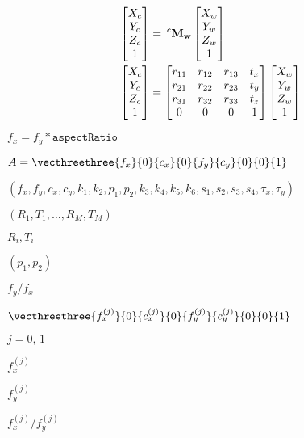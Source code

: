 \documentclass{article}
\begin{document}
\[ \begin{align*} \begin{bmatrix} X_c \\ Y_c \\ Z_c \\ 1 \end{bmatrix} &= \hspace{0.2em} ^{c}\bf{M}_w \begin{bmatrix} X_{w} \\ Y_{w} \\ Z_{w} \\ 1 \end{bmatrix} \\ \begin{bmatrix} X_c \\ Y_c \\ Z_c \\ 1 \end{bmatrix} &= \begin{bmatrix} r_{11} & r_{12} & r_{13} & t_x \\ r_{21} & r_{22} & r_{23} & t_y \\ r_{31} & r_{32} & r_{33} & t_z \\ 0 & 0 & 0 & 1 \end{bmatrix} \begin{bmatrix} X_{w} \\ Y_{w} \\ Z_{w} \\ 1 \end{bmatrix} \end{align*} \]
\pagebreak

$f_x = f_y * \texttt{aspectRatio}$
\pagebreak

$A = \vecthreethree{f_x}{0}{c_x}{0}{f_y}{c_y}{0}{0}{1}$
\pagebreak

$(f_x, f_y, c_x, c_y, k_1, k_2, p_1, p_2, k_3, k_4, k_5, k_6 , s_1, s_2, s_3, s_4, \tau_x, \tau_y)$
\pagebreak

$(R_1, T_1, \dotsc , R_M, T_M)$
\pagebreak

$R_i, T_i$
\pagebreak

$(p_1, p_2)$
\pagebreak

$f_y/f_x$
\pagebreak

$\vecthreethree{f_x^{(j)}}{0}{c_x^{(j)}}{0}{f_y^{(j)}}{c_y^{(j)}}{0}{0}{1}$
\pagebreak

$j = 0,\, 1$
\pagebreak

$f^{(j)}_x$
\pagebreak

$f^{(j)}_y$
\pagebreak

$f^{(j)}_x/f^{(j)}_y$
\pagebreak
\end{document}

